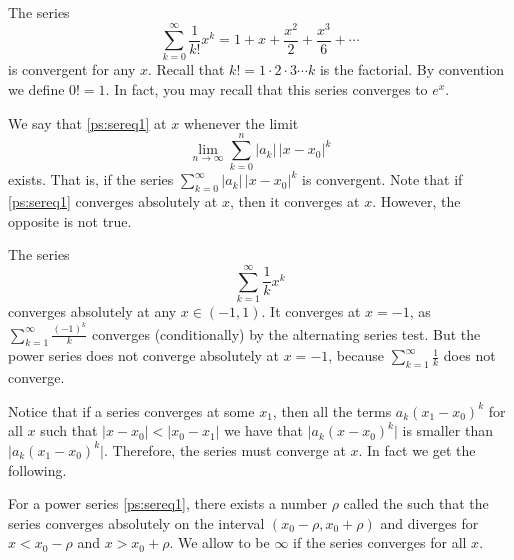 \documentclass[12pt]{book}
\begin{document}
\begin{example} \label{ps:expex}
The series
\begin{equation*}
\sum_{k=0}^\infty \frac{1}{k!} x^k = 
1 + x + \frac{x^2}{2} + \frac{x^3}{6} + \cdots
\end{equation*}
is convergent for any $x$.
Recall that $k! = 1\cdot 2\cdot 3 \cdots k$ is the
factorial.  By convention we define $0! = 1$.
In fact, you may recall that this series
converges to $e^x$.
\end{example}

\medskip

We say that \eqref{ps:sereq1}
\emph{}
at $x$ whenever the limit
\begin{equation*}
\lim_{n\to\infty} \sum_{k=0}^n
\lvert a_k \rvert \, {\lvert x-x_0 \rvert}^k 
\end{equation*}
exists.  That is, if the series
$\sum_{k=0}^\infty \lvert a_k \rvert \, {\lvert x-x_0 \rvert}^k$
is convergent.
Note that if \eqref{ps:sereq1} converges absolutely at $x$, then it
converges at $x$.  However, the opposite is not true.

\begin{example} \label{ps:1kex}
The series
\begin{equation*}
\sum_{k=1}^\infty \frac{1}{k} x^k
\end{equation*}
converges absolutely at any $x \in (-1,1)$.  It converges at $x=-1$,
as
$\sum_{k=1}^\infty \frac{{(-1)}^k}{k}$ converges (conditionally)
by the alternating series
test.
But the power series does not converge absolutely at $x=-1$, because
$\sum_{k=1}^\infty \frac{1}{k}$ does not converge.
\end{example}

Notice that if a series converges at some $x_1$, then all the terms
$a_k (x_1-x_0)^k$ for all $x$ such that
$\lvert x - x_0  \rvert < \lvert x_0 - x_1 \vert$ we have that
$\lvert a_k (x-x_0)^k \rvert$ is smaller than
$\lvert a_k (x_1-x_0)^k \rvert$.  Therefore, the series must converge
at $x$.  In fact we get the following.

\begin{theorem}
For a power series \eqref{ps:sereq1}, there exists a number
$\rho$ called the \emph{} such that
the series converges absolutely on the interval
$(x_0-\rho,x_0+\rho)$ and diverges for $x < x_0-\rho$ and $x > x_0+\rho$.
We allow to be $\infty$ if the series converges for all $x$.
\end{theorem}
\end{document}
